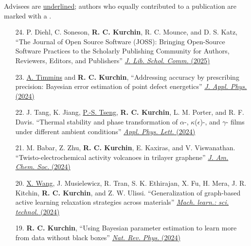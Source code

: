 Advisees are \uline{underlined}; authors who equally contributed to a publication are marked with a \textdagger.

\newcommand{\myname}{\textbf{R. C. Kurchin}}

\begin{enumerate}
        \item[24.] P. Diehl, C. Soneson, \myname, R. C. Mounce, and D. S. Katz, ``The Journal of Open Source Software (JOSS): Bringing Open-Source Software Practices to the Scholarly Publishing Community for Authors, Reviewers, Editors, and Publishers'' \href{https://doi.org/10.31274/jlsc.18285}{\textit{J. Lib. Schol. Comm.} (2025)}

        \item[23.] \uline{A. Timmins} and \myname, ``Addressing accuracy by prescribing precision: Bayesian error estimation of point defect energetics'' \href{https://doi.org/10.1063/5.0211543}{\textit{J. Appl. Phys.} (2024)}

        \item[22.] J. Tang, K. Jiang, \uline{P.-S. Tseng}, \myname, L. M. Porter, and R. F. Davis. ``Thermal stability and phase transformation of $\alpha$-, $\kappa$($\epsilon$)-, and $\gamma$- films under different ambient conditions'' \href{https://doi.org/10.1063/5.0214500}{\textit{Appl. Phys. Lett.} (2024)}

        \item[21.] M. Babar, Z. Zhu, \myname, E. Kaxiras, and V. Viswanathan. ``Twisto-electrochemical activity volcanoes in trilayer graphene'' \href{https://pubs.acs.org/doi/full/10.1021/jacs.4c03464}{\textit{J. Am. Chem. Soc.} (2024)}

        \item[20.] \uline{X. Wang}, J. Musielewicz, R. Tran, S. K. Ethirajan, X. Fu, H. Mera, J. R. Kitchin, \myname, and Z. W. Ulissi. ``Generalization of graph-based active learning relaxation strategies across materials'' \href{https://iopscience.iop.org/article/10.1088/2632-2153/ad37f0}{\textit{Mach. learn.: sci. technol.} (2024)}

        \item[19.] \myname, ``Using Bayesian parameter estimation to learn more from data without black boxes'' \href{https://www.nature.com/articles/s42254-024-00698-0}{\textit{Nat. Rev. Phys.} (2024)}


\end{enumerate}
